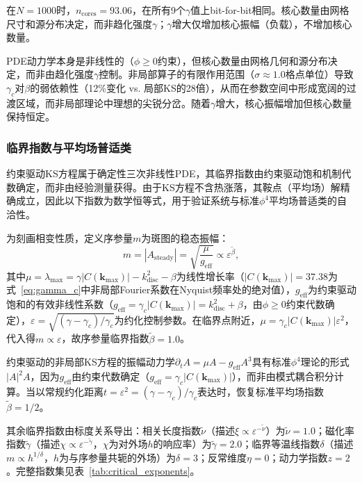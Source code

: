 \documentclass[sn-nature,pdflatex]{sn-jnl}
\begin{document}
在$N=1000$时，$n_{\text{cores}} = 93.06$，在所有9个$\gamma$值上bit-for-bit相同。核心数量由网格尺寸和源分布决定，而非趋化强度$\gamma$；$\gamma$增大仅增加核心振幅（负载），不增加核心数量。

PDE动力学本身是非线性的（$\phi \geq 0$约束），但核心数量由网格几何和源分布决定，而非由趋化强度$\gamma$控制。非局部算子的有限作用范围（$\sigma \approx 1.0$格点单位）导致$\gamma_c$对$\beta$的弱依赖性（12\%变化 vs. 局部KS的28倍），从而在参数空间中形成宽阔的过渡区域，而非局部理论中理想的尖锐分岔。随着$\gamma$增大，核心振幅增加但核心数量保持恒定。

\subsubsection{临界指数与平均场普适类}

约束驱动KS方程属于确定性三次非线性PDE，其临界指数由约束驱动饱和机制代数确定，而非由经验测量获得。由于KS方程不含热涨落，其鞍点（平均场）解精确成立，因此以下指数为数学恒等式，用于验证系统与标准$\phi^4$平均场普适类的自洽性。

为刻画相变性质，定义序参量$m$为斑图的稳态振幅：
\begin{equation}
m = |A_{\text{steady}}| = \sqrt{\frac{\mu}{g_{\text{eff}}}} \propto \varepsilon^{\tilde{\beta}},
\label{eq:order_param}
\end{equation}
其中$\mu = \lambda_{\max} = \gamma |C(\mathbf{k}_{\max})| - k^2_{\text{disc}} - \beta$为线性增长率（$|C(\mathbf{k}_{\max})| = 37.38$为式~\ref{eq:gamma_c}中非局部Fourier系数在Nyquist频率处的绝对值），$g_{\text{eff}}$为约束驱动饱和的有效非线性系数（$g_{\text{eff}} = \gamma_c |C(\mathbf{k}_{\max})| = k^2_{\text{disc}} + \beta$，由$\phi \geq 0$约束代数确定），$\varepsilon = \sqrt{(\gamma-\gamma_c)/\gamma_c}$为约化控制参数。在临界点附近，$\mu = \gamma_c |C(\mathbf{k}_{\max})| \varepsilon^2$，代入得$m \propto \varepsilon$，故序参量临界指数$\tilde{\beta} = 1.0$。

约束驱动的非局部KS方程的振幅动力学$\partial_t A = \mu A - g_{\text{eff}} A^3$具有标准$\phi^4$理论的形式$|A|^2 A$，因为$g_{\text{eff}}$由约束代数确定（$g_{\text{eff}} = \gamma_c |C(\mathbf{k}_{\max})|$），而非由模式耦合积分计算。当以常规约化距离$t = \varepsilon^2 = (\gamma-\gamma_c)/\gamma_c$表达时，恢复标准平均场指数$\tilde{\beta} = 1/2$。

其余临界指数由标度关系导出：相关长度指数$\tilde{\nu}$（描述$\xi \propto \varepsilon^{-\tilde{\nu}}$）为$\tilde{\nu} = 1.0$；磁化率指数$\tilde{\gamma}$（描述$\chi \propto \varepsilon^{-\tilde{\gamma}}$，$\chi$为对外场$h$的响应率）为$\tilde{\gamma} = 2.0$；临界等温线指数$\delta$（描述$m \propto h^{1/\delta}$，$h$为与序参量共轭的外场）为$\delta = 3$；反常维度$\eta = 0$；动力学指数$z = 2$。完整指数集见表~\ref{tab:critical_exponents}。
\end{document}
